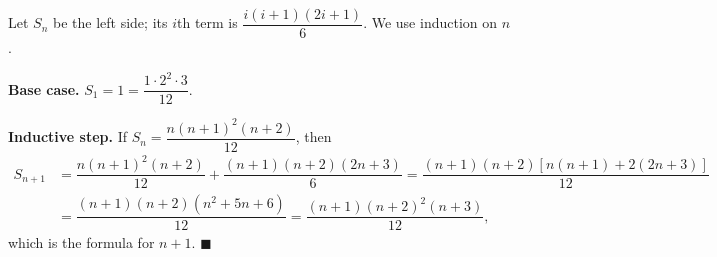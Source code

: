 Let $S_n$ be the left side; its $i$th term is $\dfrac{i(i+1)(2i+1)}{6}$. We use induction on $n$.

\textbf{Base case.} $S_1=1=\dfrac{1\cdot2^2\cdot3}{12}$.

\textbf{Inductive step.} If $S_n=\dfrac{n(n+1)^2(n+2)}{12}$, then
\begin{align*}
S_{n+1}&=\dfrac{n(n+1)^2(n+2)}{12}+\dfrac{(n+1)(n+2)(2n+3)}{6}=\dfrac{(n+1)(n+2)\left[n(n+1)+2(2n+3)\right]}{12}\\
&=\dfrac{(n+1)(n+2)\left(n^2+5n+6\right)}{12}=\dfrac{(n+1)(n+2)^2(n+3)}{12},
\end{align*}
which is the formula for $n+1$. $\blacksquare$
